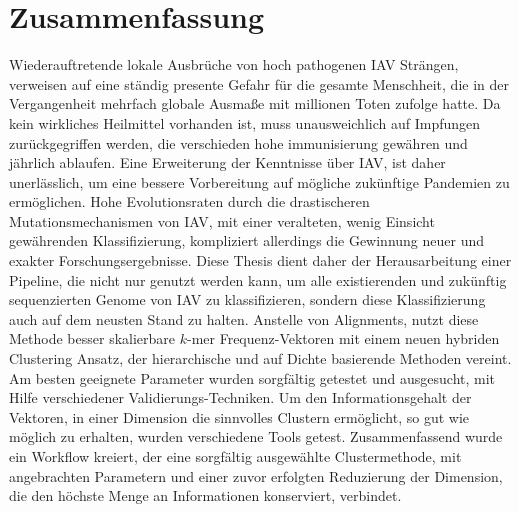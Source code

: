 \chapter*{Zusammenfassung}

Wiederauftretende lokale Ausbrüche von hoch pathogenen \gls{IAV} Strängen, verweisen auf eine ständig presente Gefahr für die gesamte Menschheit, die in der Vergangenheit mehrfach globale Ausmaße mit millionen Toten zufolge hatte. Da kein wirkliches Heilmittel vorhanden ist, muss unausweichlich auf Impfungen zurückgegriffen werden, die verschieden hohe immunisierung gewähren und jährlich ablaufen. Eine Erweiterung der Kenntnisse über \gls{IAV}, ist daher unerlässlich, um eine bessere Vorbereitung auf mögliche zukünftige Pandemien zu ermöglichen. Hohe Evolutionsraten durch die drastischeren Mutationsmechanismen von \gls{IAV}, mit einer veralteten, wenig Einsicht gewährenden Klassifizierung, kompliziert allerdings die Gewinnung neuer und exakter Forschungsergebnisse. Diese Thesis dient daher der Herausarbeitung einer Pipeline, die nicht nur genutzt werden kann, um alle existierenden und zukünftig sequenzierten Genome von \gls{IAV} zu klassifizieren, sondern diese Klassifizierung auch auf dem neusten Stand zu halten. Anstelle von Alignments, nutzt diese Methode besser skalierbare $k$-mer Frequenz-Vektoren mit einem neuen hybriden Clustering Ansatz, der hierarchische und auf Dichte basierende Methoden vereint. Am besten geeignete Parameter wurden sorgfältig getestet und ausgesucht, mit Hilfe verschiedener Validierungs-Techniken. Um den Informationsgehalt der Vektoren, in einer Dimension die sinnvolles Clustern ermöglicht, so gut wie möglich zu erhalten, wurden verschiedene Tools getest. Zusammenfassend wurde ein Workflow kreiert, der eine sorgfältig ausgewählte Clustermethode, mit angebrachten Parametern und einer zuvor erfolgten Reduzierung der Dimension, die den höchste Menge an Informationen konserviert, verbindet.